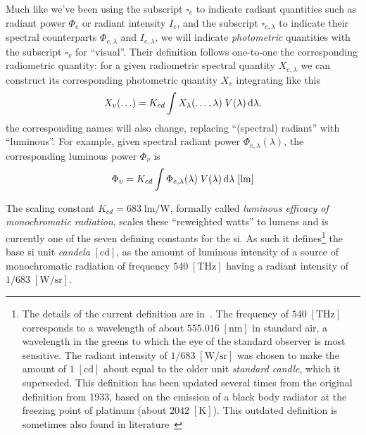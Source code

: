Much like we've been using the subscript $\square_e$ to indicate radiant quantities such as
radiant power $\Phi_e$ or radiant intensity $I_e$, and the subscript $\square_{e,\lambda}$ to indicate
their spectral counterparts $\Phi_{e,\lambda}$ and $I_{e,\lambda}$, we will
indicate \emph{photometric} quantities with the subscript $\square_v$ for ``visual''.
Their definition follows one-to-one the corresponding radiometric quantity: for a
given radiometric spectral quantity $X_{e,\lambda}$ we can construct its
corresponding photometric quantity $X_v$ integrating like this
\begin{equation}
	X_v(\ldots) = K_{cd} \int X_{\lambda}(\ldots,\lambda)\; V(\lambda) \mathop{}\!\mathrm{d}\lambda.
\label{eqn:rad_to_photo}
\end{equation}
the corresponding names will also change, replacing ``(spectral) radiant'' with ``luminous''.
For example, given spectral radiant power $\Phi_{e,\lambda}(\lambda)$, the
corresponding luminous power $\Phi_v$ is
\begin{equation}
\Phi_v = K_{cd} \int \Phi_{e,\lambda}(\lambda)\; V(\lambda) \d\lambda \;[\unit\lumen]
\end{equation}

The scaling constant $K_{cd} = 683\;\unit{\lumen\per\watt}$, formally called \textsl{luminous efficacy of monochromatic radiation}, 
scales these ``reweighted watts'' to lumens and is currently one of the seven defining constants 
for the \gls{si}. 
As such it defines\footnote{
	The details of the current definition are in~\cite[p. 135]{bipm:si.2019}.
	The frequency of $\num{540}\;[\unit{\tera\hertz}]$ corresponds to a wavelength of 
	about $\num{555.016}\;[\unit{\nano\meter}]$ in \gls{standard air}, a wavelength in the 
	greens to which the eye of the standard observer is most sensitive.
	The radiant intensity of $1/683\;[\unit{\watt\per\steradian}]$ was chosen to make 
	the amount of $1\;[\unit\candela]$ about equal to the older unit
	\textit{standard candle}, which it superseded. 
	This definition has been updated several times from the original definition 
	from 1933, based on the emission of a black body radiator
	at the freezing point of platinum (about $\num{2042}\;[\unit{\kelvin}]$). 
	This outdated definition is sometimes also found in 
	literature~\cite{Meyer-Arendt:68}
} the base \gls{si} unit \textsl{candela} $[\unit{\candela}]$, 
as the amount of luminous intensity of a source of monochromatic radiation of frequency 
$\num{540}\;[\unit{\tera\hertz}]$ having a radiant intensity of $1/683\;[\unit{\watt\per\steradian}]$.

